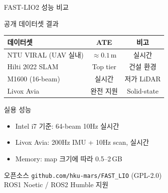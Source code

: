 \begin{frame}{FAST-LIO2 성능 비교}
  \begin{block}{공개 데이터셋 결과}
    \begin{center}
      \begin{tabular}{lcc}
        \hline
        \textbf{데이터셋} & \textbf{ATE} & \textbf{비고} \\
        \hline
        NTU VIRAL (UAV 실내) & $\approx0.1$\,m & 실시간 \\
        Hilti 2022 SLAM & Top tier & 건설 환경 \\
        M1600 (16-beam) & 실시간 & 저가 LiDAR \\
        Livox Avia & 완전 지원 & Solid-state \\
        \hline
      \end{tabular}
    \end{center}
  \end{block}
  \pause
  \begin{block}{실용 성능}
    \begin{itemize}
      \item Intel i7 기준: 64-beam 10Hz 실시간
      \item Livox Avia: 200Hz IMU + 10Hz scan, 실시간
      \item Memory: map 크기에 따라 0.5--2\,GB
    \end{itemize}
  \end{block}
  \pause
  \begin{exampleblock}{오픈소스}
    \texttt{github.com/hku-mars/FAST\_LIO} (GPL-2.0)\\
    ROS1 Noetic / ROS2 Humble 지원
  \end{exampleblock}
\end{frame}

